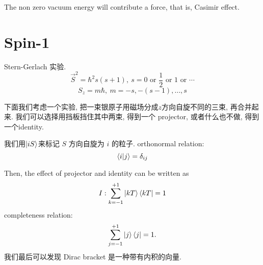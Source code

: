 
The non zero vacuum energy will contribute a force, that is, Casimir effect.

\chapter[自旋-1]{Spin-1}
Stern-Gerlach 实验.
\begin{equation}
  \vec{S}^{2} = \hbar^{2}s(s+1), \ s = 0\text{ or } \frac{1}{2} \text{ or } 1 \text{ or } \cdots
\end{equation}
\begin{equation}
  S_z = m\hbar , \ m = -s, -(s - 1), \ldots , s
\end{equation}

下面我们考虑一个实验, 把一束银原子用磁场分成$z$方向自旋不同的三束, 再合并起来. 我们可以选择用挡板挡住其中两束, 得到一个 projector, 或者什么也不做, 得到一个identity.

我们用$ \ket{iS} $来标记 $S$ 方向自旋为 $i$ 的粒子. 
orthonormal relation:
\begin{equation}
  \bra{i}\ket{j} = \delta_{ij}
\end{equation}

Then, the effect of projector and identity can be written as
\begin{equation}
  I : \sum_{k=-1}^{+1} \ket{k T} \bra{kT} = 1
\end{equation}
completeness relation:
\begin{equation}
  \sum_{j=-1}^{+1} \ket{j} \bra{j} = 1.
\end{equation}
我们最后可以发现 Dirac bracket 是一种带有内积的向量.